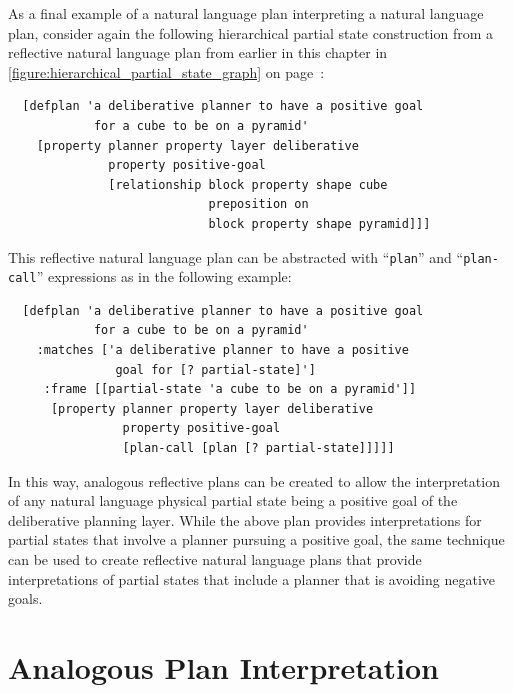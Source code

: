 As a final example of a natural language plan interpreting a natural
language plan, consider again the following hierarchical partial state
construction from a reflective natural language plan from earlier in
this chapter in
{\mbox{\autoref{figure:hierarchical_partial_state_graph}}} on
{\mbox{page~\pageref{figure:hierarchical_partial_state_graph}}}:
\begin{samepage}
\begin{Verbatim}
  [defplan 'a deliberative planner to have a positive goal
            for a cube to be on a pyramid'
    [property planner property layer deliberative
              property positive-goal
              [relationship block property shape cube
                            preposition on
                            block property shape pyramid]]]
\end{Verbatim}
\end{samepage}
This reflective natural language plan can be abstracted with
``{\tt{plan}}'' and ``{\tt{plan-call}}'' expressions as in the
following example:
\begin{samepage}
\begin{Verbatim}
  [defplan 'a deliberative planner to have a positive goal
            for a cube to be on a pyramid'
    :matches ['a deliberative planner to have a positive
               goal for [? partial-state]']
     :frame [[partial-state 'a cube to be on a pyramid']]
      [property planner property layer deliberative
                property positive-goal
                [plan-call [plan [? partial-state]]]]]
\end{Verbatim}
\end{samepage}
In this way, analogous reflective plans can be created to allow the
interpretation of any natural language physical partial state being a
positive goal of the deliberative planning layer.  While the above
plan provides interpretations for partial states that involve a
planner pursuing a positive goal, the same technique can be used to
create reflective natural language plans that provide interpretations
of partial states that include a planner that is avoiding negative
goals.

\section{Analogous Plan Interpretation}

